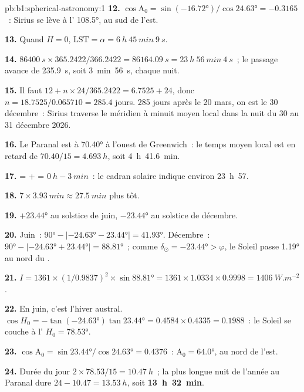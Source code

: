 \begin{solution}{pb:b1:spherical-astronomy:1}
\textbf{12.} $\cos\mathrm{A}_0 = \sin(\ang{-16.72})/\cos\ang{24.63} =
-0.3165$~: Sirius se lève à l' \ang{108.5}, au sud de l'est.

\textbf{13.} Quand $H = 0$, $\mathrm{LST} = \alpha = \qty{6}{h}~\qty{45}{min}~\qty{9}{s}$.

\textbf{14.} $\qty{86400}{s}\times365.2422/366.2422 = \qty{86164.09}{s} =
\qty{23}{h}~\qty{56}{min}~\qty{4}{s}$~; le passage avance de
\qty{235.9}{s}, soit \qty{3}{min}~\qty{56}{s}, chaque nuit.

\textbf{15.} Il faut $12 + n\times24/365.2422 = 6.7525 + 24$, donc
$n = 18.7525/0.065710 = 285.4$ jours. 285 jours après le 20 mars, on est le
30 décembre~: Sirius traverse le méridien à minuit moyen local dans la nuit du
30 au 31 décembre 2026.

\textbf{16.} Le Paranal est à \ang{70.40} à l'ouest de Greenwich~: le temps
moyen local est en retard de $70.40/15 = \qty{4.693}{h}$, soit
\qty{4}{h}~\qty{41.6}{min}.

\textbf{17.}  =  +  =
$\qty{0}{h} - \qty{3}{min}$~: le cadran solaire indique environ 23~h~57.

\textbf{18.} $7\times\qty{3.93}{min} \approx \qty{27.5}{min}$ plus tôt.

\textbf{19.} $+\ang{23.44}$ au solstice de juin, $-\ang{23.44}$ au solstice de
décembre.

\textbf{20.} Juin~: $\ang{90} - |\ang{-24.63} - \ang{23.44}| = \ang{41.93}$.
Décembre~: $\ang{90} - |\ang{-24.63} + \ang{23.44}| = \ang{88.81}$~; comme
$\delta_\odot = \ang{-23.44} > \varphi$, le Soleil passe \ang{1.19} au nord du
.

\textbf{21.} $I = 1361\times(1/0.9837)^2\times\sin\ang{88.81} = 1361\times
1.0334\times0.9998 = \qty{1406}{W.m^{-2}}$.

\textbf{22.} En juin, c'est l'hiver austral. $\cos H_0 = -\tan(\ang{-24.63})
\tan\ang{23.44} = 0.4584\times0.4335 = 0.1988$~: le Soleil se couche à l' $H_0 = \ang{78.53}$.

\textbf{23.} $\cos\mathrm{A}_0 = \sin\ang{23.44}/\cos\ang{24.63} = 0.4376$~:
$\mathrm{A}_0 = \ang{64.0}$, au nord de l'est.

\textbf{24.} Durée du jour $2\times78.53/15 = \qty{10.47}{h}$~; la plus longue
nuit de l'année au Paranal dure $24 - 10.47 = \qty{13.53}{h}$, soit
\textbf{\qty[text-series-to-math=true]{13}{h}~\qty[text-series-to-math=true]{32}{min}}.
\end{solution}
